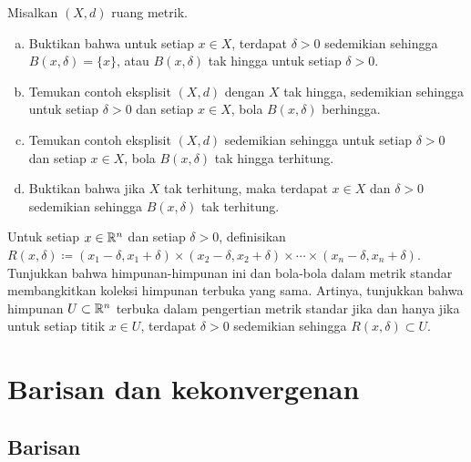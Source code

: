 \begin{samepage}
\begin{exercise}
Misalkan $(X,d)$ ruang metrik.
\begin{enumerate}[a)]
\item
Buktikan bahwa untuk setiap $x \in X$, terdapat $\delta > 0$ sedemikian sehingga
$B(x,\delta) = \{ x \}$, atau $B(x,\delta)$ tak hingga untuk setiap $\delta >  0$.
\item
Temukan contoh eksplisit $(X,d)$ dengan $X$ tak hingga, sedemikian sehingga
untuk setiap $\delta > 0$ dan
setiap $x \in X$,
bola $B(x,\delta)$ berhingga.
\item
Temukan contoh eksplisit $(X,d)$ sedemikian sehingga untuk setiap $\delta > 0$ dan
setiap $x \in X$,
bola $B(x,\delta)$ tak hingga terhitung.
\item
Buktikan bahwa jika $X$ tak terhitung, maka terdapat
$x \in X$ dan $\delta > 0$ sedemikian sehingga $B(x,\delta)$ tak terhitung.
\end{enumerate}
\end{exercise}
\end{samepage}

\begin{exercise}
Untuk setiap $x \in {\mathbb{R}}^n$ dan setiap $\delta > 0$, definisikan 
$R(x,\delta) \coloneqq
(x_1-\delta,x_1+\delta) \times
(x_2-\delta,x_2+\delta) \times \cdots \times
(x_n-\delta,x_n+\delta)$.  Tunjukkan bahwa himpunan-himpunan ini dan bola-bola
dalam metrik standar membangkitkan koleksi himpunan terbuka yang sama.  Artinya, tunjukkan bahwa himpunan $U \subset {\mathbb{R}}^n$
terbuka dalam pengertian metrik standar jika dan hanya jika untuk setiap
titik $x \in U$, terdapat $\delta > 0$ sedemikian sehingga $R(x,\delta) \subset
U$.
\end{exercise}


\sectionnewpage
\section{Barisan dan kekonvergenan}
\label{sec:metseqs}



\subsection{Barisan}

